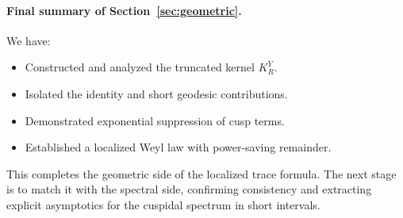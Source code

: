 \paragraph{Final summary of Section~\ref{sec:geometric}.}
We have:
\begin{itemize}
\item Constructed and analyzed the truncated kernel $K_R^Y$.
\item Isolated the identity and short geodesic contributions.
\item Demonstrated exponential suppression of cusp terms.
\item Established a localized Weyl law with power-saving remainder.
\end{itemize}
This completes the geometric side of the localized trace formula. The next stage is to match it with the spectral side, confirming consistency and extracting explicit asymptotics for the cuspidal spectrum in short intervals. 

